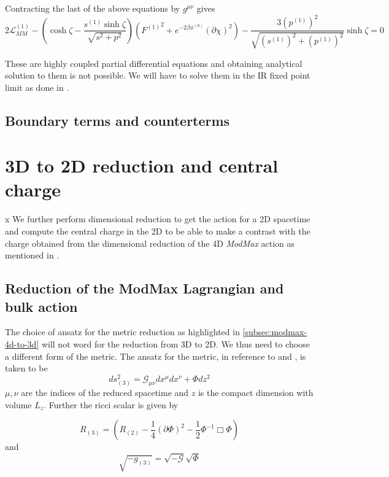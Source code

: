 Contracting the last of the above equations by $g^{\mu\nu}$ gives 
\begin{equation}
    2\mathcal{L}^{(1)}_{MM} - \left ( \cosh \zeta - \frac{s^{(1)}\sinh\zeta}{\sqrt{s^2+p^2} } \right ) \left ( {F^{(1)}}^2 + e^{-2\beta\phi^{(0)}}(\partial\chi)^2 \right ) - \frac{3(p^{(1)})^2}{\sqrt{(s^{(1)})^2+(p^{(1)})^2}}\sinh\zeta = 0 \nonumber
\end{equation}

These are highly coupled partial differential equations and obtaining analytical solution to them is not possible. We will have to solve them in the IR fixed point limit as done in \cite{rathi2023ads2}.

\subsection{Boundary terms and counterterms}




\section{3D to 2D reduction and central charge}
                                                    x
We further perform dimensional reduction to get the action for a 2D spacetime and compute the central charge in the 2D to be able to make a contrast with the charge obtained from the dimensional reduction of the 4D \textit{ModMax} action as mentioned in \cite{rathi2023ads2}. 

\subsection{Reduction of the ModMax Lagrangian and bulk action}
The choice of ansatz for the metric reduction as highlighted in \ref{subsec:modmax-4d-to-3d} will not word for the reduction from 3D to 2D. We thus need to choose a different form of the metric. The ansatz for the metric, in reference to \cite{Dharewa2024} and \cite{rathi2023ads2}, is taken to be 
\begin{equation}
    ds_{(3)}^2 = \mathcal{G}_{\mu\nu}dx^\mu dx^\nu + \Phi dz^2
\end{equation}
$\mu,\nu$ are the indices of the reduced spacetime and $z$ is the compact dimension with volume $L_z$. Further the ricci scalar is given by 

\begin{equation}
    R_{(3)} = \left ( R_{(2)} - \frac{1}{4}(\partial\Phi)^2 - \frac{1}{2}\Phi^{-1} \Box\Phi \right )
\end{equation}
and 
\begin{equation}
    \sqrt{-g_{(3)}} = \sqrt{-\mathcal{G}}\sqrt{ \Phi}
\end{equation}

